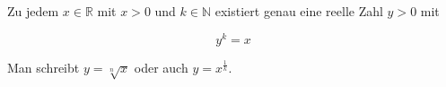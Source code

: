 Zu jedem $x \in \mathbb{R}$ mit $x > 0$ und $k \in \mathbb{N}$ existiert genau eine reelle Zahl $y > 0$ mit

$$y^k = x$$

Man schreibt $y = \sqrt[n]{x}$ oder auch $y = x^{\frac{1}{k}}$.